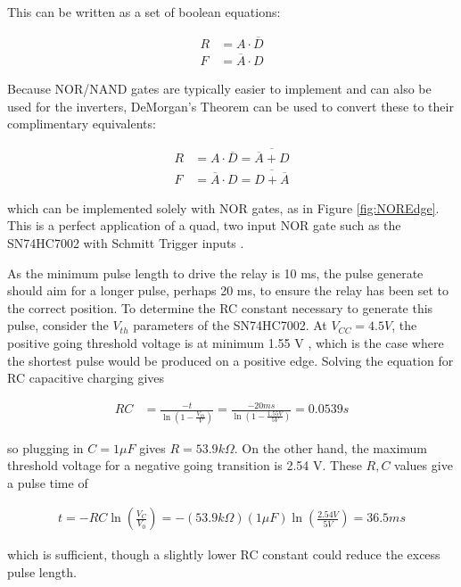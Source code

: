 \documentclass{article}
\begin{document}
		This can be written as a set of boolean equations:

		\begin{align}
			R &= A \cdot \overline{D} \\
			F &= \overline{A} \cdot D
		\end{align}

		Because NOR/NAND gates are typically easier to implement and can also be used for the inverters, DeMorgan's Theorem can be used to convert these to their complimentary equivalents:

		\begin{align}
			R &= A \cdot \overline{D} = \overline{\overline{A} + D}\\
			F &= \overline{A} \cdot D = \overline{D + \overline{A}}
		\end{align}

		which can be implemented solely with NOR gates, as in Figure \ref{fig:NOREdge}.  This is a perfect application of a quad, two input NOR gate such as the SN74HC7002 with Schmitt Trigger inputs \cite{SN74HC7002datasheet}.

		As the minimum pulse length to drive the relay is 10 ms, the pulse generate should aim for a longer pulse, perhaps 20 ms, to ensure the relay has been set to the correct position.  To determine the RC constant necessary to generate this pulse, consider the $V_{th}$ parameters of the SN74HC7002.  At $V_{CC} = 4.5V$, the positive going threshold voltage is at minimum 1.55 V \cite{SN74HC7002datasheet}, which is the case where the shortest pulse would be produced on a positive edge.  Solving the equation for RC capacitive charging gives

		\begin{align}
			RC &= \frac{-t}{\ln\left( 1 - \frac{V_{th}}{V} \right)} = \frac{-20ms}{\ln\left( 1 - \frac{1.55V}{5V} \right)} = 0.0539 s
		\end{align}

		so plugging in $C = 1 \mu F$ gives $R = 53.9 k\Omega$.  On the other hand, the maximum threshold voltage for a negative going transition is 2.54 V.  These $R, C$ values give a pulse time of 

		\begin{align}
			t  = - RC\ln\left( \frac{V_C}{V_0} \right) = -(53.9 k\Omega)(1 \mu F) \ln\left(\frac{2.54V}{5V} \right) = 36.5 ms
		\end{align}

		which is sufficient, though a slightly lower RC constant could reduce the excess pulse length.
\end{document}
